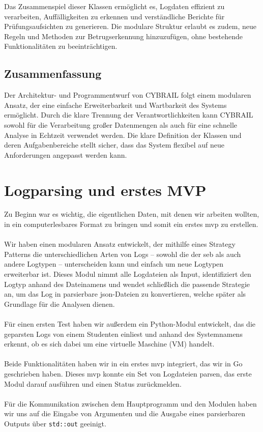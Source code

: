 Das Zusammenspiel dieser Klassen ermöglicht es, Logdaten effizient zu verarbeiten, Auffälligkeiten zu erkennen und verständliche Berichte für Prüfungsaufsichten zu generieren. 
Die modulare Struktur erlaubt es zudem, neue Regeln und Methoden zur Betrugserkennung hinzuzufügen, ohne bestehende Funktionalitäten zu beeinträchtigen.

\subsection{Zusammenfassung}

Der Architektur- und Programmentwurf von CYBRAIL folgt einem modularen Ansatz, der eine einfache Erweiterbarkeit und Wartbarkeit des Systems ermöglicht. Durch die klare Trennung der Verantwortlichkeiten kann CYBRAIL sowohl für die Verarbeitung großer Datenmengen als auch für eine schnelle Analyse in Echtzeit verwendet werden. Die klare Definition der Klassen und deren Aufgabenbereiche stellt sicher, dass das System flexibel auf neue Anforderungen angepasst werden kann.

\section{Logparsing und erstes MVP}
Zu Beginn war es wichtig, die eigentlichen Daten, mit denen wir arbeiten wollten, in ein computerlesbares Format zu bringen und somit ein erstes \gls{mvp} zu erstellen.\\
\\
Wir haben einen modularen Ansatz entwickelt, der mithilfe eines Strategy Patterns die unterschiedlichen Arten von Logs – sowohl die der \gls{seb} als auch andere Logtypen – unterscheiden kann und einfach um neue Logtypen erweiterbar ist. 
Dieses Modul nimmt alle Logdateien als Input, identifiziert den Logtyp anhand des Dateinamens und wendet schließlich die passende Strategie an, um das Log in parsierbare \gls{json}-Dateien zu konvertieren, welche später als Grundlage für die Analysen dienen.\\
\\
Für einen ersten Test haben wir außerdem ein Python-Modul entwickelt, das die geparsten Logs von einem Studenten einliest und anhand des Systemnamens erkennt, ob es sich dabei um eine virtuelle Maschine (VM) handelt.\\
\\
Beide Funktionalitäten haben wir in ein erstes \gls{mvp} integriert, das wir in Go geschrieben haben. Dieses \gls{mvp} konnte ein Set von Logdateien parsen, das erste Modul darauf ausführen und einen Status zurückmelden.\\
\\
Für die Kommunikation zwischen dem Hauptprogramm und den Modulen haben wir uns auf die Eingabe von Argumenten und die Ausgabe eines parsierbaren Outputs über \texttt{std::out} geeinigt.

